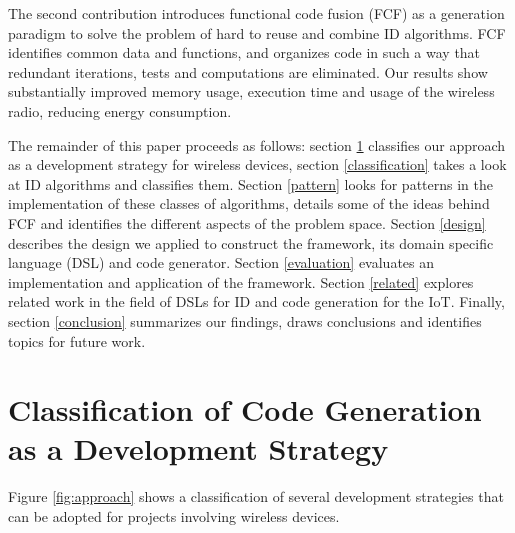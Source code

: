 \documentclass[conference]{IEEEtran}
\begin{document}

The second contribution introduces functional code fusion (FCF) as a generation
paradigm to solve the problem of hard to reuse and combine ID algorithms. FCF
identifies common data and functions, and organizes code in such a way that
redundant iterations, tests and computations are eliminated. Our results show
substantially improved memory usage, execution time and usage of the wireless
radio, reducing energy consumption.


The remainder of this paper proceeds as follows: section \ref{approach}
classifies our approach as a development strategy for wireless devices, section
\ref{classification} takes a look at ID algorithms and classifies them. Section
\ref{pattern} looks for patterns in the implementation of these classes of
algorithms, details some of the ideas behind FCF and identifies the different
aspects of the problem space. Section \ref{design} describes the design we
applied to construct the framework, its domain specific language (DSL) and code
generator. Section \ref{evaluation} evaluates an implementation and application
of the framework. Section \ref{related} explores related work in the field of
DSLs for ID and code generation for the IoT. Finally, section \ref{conclusion}
summarizes our findings, draws conclusions and identifies topics for future
work.

\section{Classification of Code Generation as a Development Strategy}
\label{approach}

Figure \ref{fig:approach} shows a classification of several development
strategies that can be adopted for projects involving wireless devices.
\end{document}
